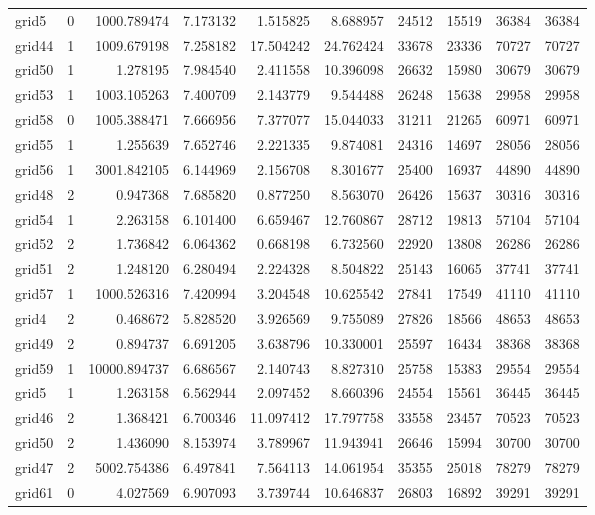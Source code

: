 \begin{longtable}{|l|r|r|r|r|r|r|r|r|r|}
grid5 & 0 & 1000.789474 & 7.173132 & 1.515825 & 8.688957 & 24512 & 15519 & 36384 & 36384 \\
grid44 & 1 & 1009.679198 & 7.258182 & 17.504242 & 24.762424 & 33678 & 23336 & 70727 & 70727 \\
grid50 & 1 & 1.278195 & 7.984540 & 2.411558 & 10.396098 & 26632 & 15980 & 30679 & 30679 \\
grid53 & 1 & 1003.105263 & 7.400709 & 2.143779 & 9.544488 & 26248 & 15638 & 29958 & 29958 \\
grid58 & 0 & 1005.388471 & 7.666956 & 7.377077 & 15.044033 & 31211 & 21265 & 60971 & 60971 \\
grid55 & 1 & 1.255639 & 7.652746 & 2.221335 & 9.874081 & 24316 & 14697 & 28056 & 28056 \\
grid56 & 1 & 3001.842105 & 6.144969 & 2.156708 & 8.301677 & 25400 & 16937 & 44890 & 44890 \\
grid48 & 2 & 0.947368 & 7.685820 & 0.877250 & 8.563070 & 26426 & 15637 & 30316 & 30316 \\
grid54 & 1 & 2.263158 & 6.101400 & 6.659467 & 12.760867 & 28712 & 19813 & 57104 & 57104 \\
grid52 & 2 & 1.736842 & 6.064362 & 0.668198 & 6.732560 & 22920 & 13808 & 26286 & 26286 \\
grid51 & 2 & 1.248120 & 6.280494 & 2.224328 & 8.504822 & 25143 & 16065 & 37741 & 37741 \\
grid57 & 1 & 1000.526316 & 7.420994 & 3.204548 & 10.625542 & 27841 & 17549 & 41110 & 41110 \\
grid4 & 2 & 0.468672 & 5.828520 & 3.926569 & 9.755089 & 27826 & 18566 & 48653 & 48653 \\
grid49 & 2 & 0.894737 & 6.691205 & 3.638796 & 10.330001 & 25597 & 16434 & 38368 & 38368 \\
grid59 & 1 & 10000.894737 & 6.686567 & 2.140743 & 8.827310 & 25758 & 15383 & 29554 & 29554 \\
grid5 & 1 & 1.263158 & 6.562944 & 2.097452 & 8.660396 & 24554 & 15561 & 36445 & 36445 \\
grid46 & 2 & 1.368421 & 6.700346 & 11.097412 & 17.797758 & 33558 & 23457 & 70523 & 70523 \\
grid50 & 2 & 1.436090 & 8.153974 & 3.789967 & 11.943941 & 26646 & 15994 & 30700 & 30700 \\
grid47 & 2 & 5002.754386 & 6.497841 & 7.564113 & 14.061954 & 35355 & 25018 & 78279 & 78279 \\
grid61 & 0 & 4.027569 & 6.907093 & 3.739744 & 10.646837 & 26803 & 16892 & 39291 & 39291 \\

\end{longtable}
